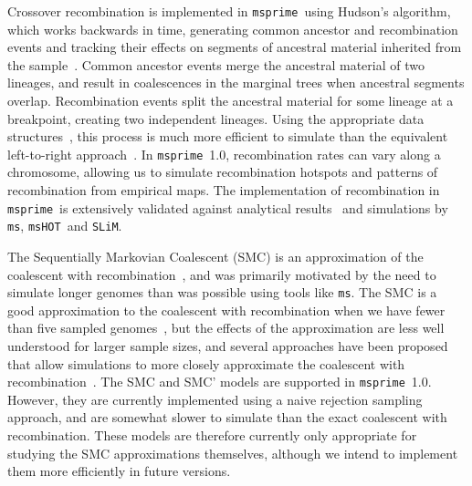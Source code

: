 \documentclass{article}
\newcommand{\msprime}[0]{\texttt{msprime}}
\newcommand{\ms}[0]{\texttt{ms}}
\newcommand{\msHOT}[0]{\texttt{msHOT}}
\newcommand{\SLiM}[0]{\texttt{SLiM}}
\begin{document}
Crossover recombination is implemented in \msprime\ using Hudson's algorithm, which
works backwards in time, generating common ancestor and recombination
events and tracking their effects on segments of ancestral
material inherited from the
sample~\citep{hudson1983properties,hudson1990gene,kelleher2016efficient}.
Common ancestor events merge the ancestral material of two lineages,
and result in coalescences in the marginal trees when ancestral
segments overlap.
Recombination events split the ancestral material for some lineage
at a breakpoint, creating two independent
lineages. Using the appropriate data structures~\citep{kelleher2016efficient},
this process is much more efficient to simulate
than the equivalent left-to-right
approach~\citep{wiuf1999recombination,wiuf1999ancestry}.
In \msprime\ 1.0, recombination rates can vary along a chromosome, allowing
us to simulate recombination hotspots and patterns
of recombination from empirical maps.
The implementation of recombination in \msprime\ is extensively validated
against analytical results~\citep{hudson1983properties,kaplan1985use}
and simulations by \ms, \msHOT\ and \SLiM.

The Sequentially Markovian Coalescent (SMC) is an approximation of the
coalescent with recombination~\citep{mcvean2005approximating,marjoram2006fast},
and was primarily motivated by the need to
simulate longer genomes than was possible using tools like \ms.
The SMC is a good approximation to the
coalescent with recombination when we have fewer than five sampled
genomes~\citep{hobolth2014markovian,wilton2015smc}, but the
effects of the approximation are less well understood for larger
sample sizes, and several approaches have been proposed
that allow simulations to more closely approximate the coalescent
with recombination~\citep{chen2009fast,wang2014new,staab2015scrm}.
The SMC and SMC' models are supported
in \msprime\ 1.0. However, they are currently implemented using a
naive rejection sampling approach, and are somewhat slower
to simulate than the exact coalescent with recombination. These
models are therefore currently only appropriate for studying the
SMC approximations themselves, although we intend to
implement them more efficiently in future versions.
\end{document}

